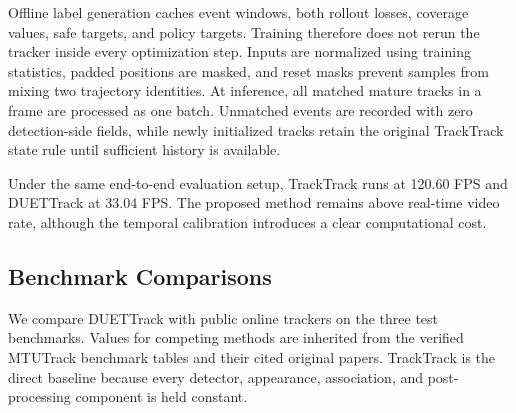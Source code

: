 \documentclass[a4paper,fleqn]{cas-sc}
\begin{document}
Offline label generation caches event windows, both rollout losses, coverage values, safe targets, and policy targets. Training therefore does not rerun the tracker inside every optimization step. Inputs are normalized using training statistics, padded positions are masked, and reset masks prevent samples from mixing two trajectory identities. At inference, all matched mature tracks in a frame are processed as one batch. Unmatched events are recorded with zero detection-side fields, while newly initialized tracks retain the original TrackTrack state rule until sufficient history is available.

Under the same end-to-end evaluation setup, TrackTrack runs at 120.60 FPS and DUETTrack at 33.04 FPS. The proposed method remains above real-time video rate, although the temporal calibration introduces a clear computational cost.

\subsection{Benchmark Comparisons}
We compare DUETTrack with public online trackers on the three test benchmarks. Values for competing methods are inherited from the verified MTUTrack benchmark tables and their cited original papers. TrackTrack is the direct baseline because every detector, appearance, association, and post-processing component is held constant.
\end{document}
